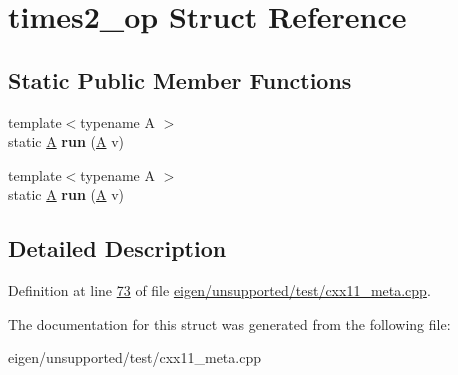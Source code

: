 \hypertarget{structtimes2__op}{}\section{times2\+\_\+op Struct Reference}
\label{structtimes2__op}
\subsection*{Static Public Member Functions}
\begin{DoxyCompactItemize}
\item 
\mbox{\label{structtimes2__op_a2a80110fea8b3877ec97370dfe3000c9}} 
{\footnotesize template$<$typename A $>$ }\\static \hyperlink{group___core___module_class_eigen_1_1_matrix}{A} {\bfseries run} (\hyperlink{group___core___module_class_eigen_1_1_matrix}{A} v)
\item 
\mbox{\label{structtimes2__op_a2a80110fea8b3877ec97370dfe3000c9}} 
{\footnotesize template$<$typename A $>$ }\\static \hyperlink{group___core___module_class_eigen_1_1_matrix}{A} {\bfseries run} (\hyperlink{group___core___module_class_eigen_1_1_matrix}{A} v)
\end{DoxyCompactItemize}


\subsection{Detailed Description}


Definition at line \hyperlink{eigen_2unsupported_2test_2cxx11__meta_8cpp_source_l00073}{73} of file \hyperlink{eigen_2unsupported_2test_2cxx11__meta_8cpp_source}{eigen/unsupported/test/cxx11\+\_\+meta.\+cpp}.



The documentation for this struct was generated from the following file\+:\begin{DoxyCompactItemize}
\item 
eigen/unsupported/test/cxx11\+\_\+meta.\+cpp\end{DoxyCompactItemize}
